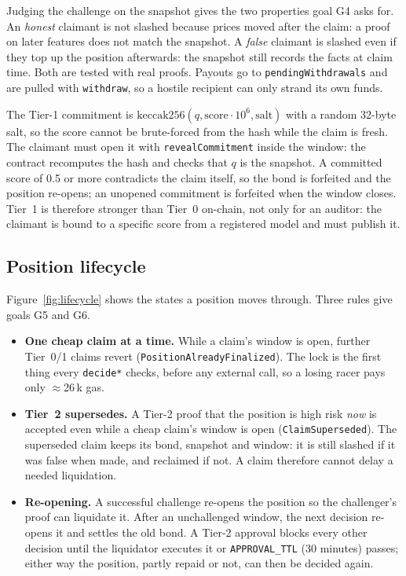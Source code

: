 \documentclass[sigconf,nonacm]{acmart}
\newcommand{\code}[1]{\texttt{\smaller #1}}
\begin{document}
Judging the challenge on the snapshot gives the two properties goal G4 asks for. An \emph{honest} claimant is not slashed because prices moved after the claim: a proof on later features does not match the snapshot. A \emph{false} claimant is slashed even if they top up the position afterwards: the snapshot still records the facts at claim time. Both are tested with real proofs. Payouts go to \code{pendingWithdrawals} and are pulled with \code{withdraw}, so a hostile recipient can only strand its own funds.

The Tier-1 commitment is $\mathrm{keccak256}(q, \mathrm{score}\cdot10^6, \mathrm{salt})$ with a random 32-byte salt, so the score cannot be brute-forced from the hash while the claim is fresh. The claimant must open it with \code{revealCommitment} inside the window: the contract recomputes the hash and checks that $q$ is the snapshot. A committed score of 0.5 or more contradicts the claim itself, so the bond is forfeited and the position re-opens; an unopened commitment is forfeited when the window closes. Tier~1 is therefore stronger than Tier~0 on-chain, not only for an auditor: the claimant is bound to a specific score from a registered model and must publish it.

\subsection{Position lifecycle}
\label{sec:design-lifecycle}

Figure~\ref{fig:lifecycle} shows the states a position moves through. Three rules give goals G5 and G6.
\begin{itemize}
  \item \textbf{One cheap claim at a time.} While a claim's window is open, further Tier~0/1 claims revert (\code{PositionAlreadyFinalized}). The lock is the first thing every \code{decide*} checks, before any external call, so a losing racer pays only $\approx$26\,k gas.
  \item \textbf{Tier~2 supersedes.} A Tier-2 proof that the position is high risk \emph{now} is accepted even while a cheap claim's window is open (\code{ClaimSuperseded}). The superseded claim keeps its bond, snapshot and window: it is still slashed if it was false when made, and reclaimed if not. A claim therefore cannot delay a needed liquidation.
  \item \textbf{Re-opening.} A successful challenge re-opens the position so the challenger's proof can liquidate it. After an unchallenged window, the next decision re-opens it and settles the old bond. A Tier-2 approval blocks every other decision until the liquidator executes it or \code{APPROVAL\_TTL} (30 minutes) passes; either way the position, partly repaid or not, can then be decided again.
\end{itemize}
\end{document}
